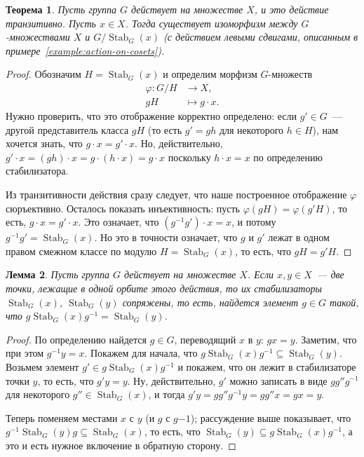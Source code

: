 \documentclass[a4paper,11pt]{scrartcl}
\theoremstyle{plain}
\newtheorem{theorem}{Теорема}[subsection]
\newtheorem{lemma}[theorem]{Лемма}
\theoremstyle{definition}
\newcommand\ph{\varphi}
\newcommand\Stab{\operatorname{Stab}}
\begin{document}
\begin{theorem}
Пусть группа $G$ действует на множестве $X$,
и это действие транзитивно.
Пусть $x\in X$.
Тогда существует изоморфизм между $G$-множествами $X$
и $G/\Stab_G(x)$ (с действием левыми сдвигами,
описанным в примере~\ref{example:action-on-cosets}).
\end{theorem}
\begin{proof}
Обозначим $H = \Stab_G(x)$ и
определим морфизм $G$-множеств
\begin{align*}
\ph\colon G/H & \to X,\\
gH & \mapsto g\cdot x.
\end{align*}
Нужно проверить, что это отображение корректно определено:
если $g'\in G$~--- другой представитель класса $gH$ (то есть
$g'=gh$ для некоторого $h\in H$), нам хочется знать, что
$g\cdot x = g'\cdot x$.
Но, действительно,
$g'\cdot x = (gh)\cdot x = g\cdot (h\cdot x) = g\cdot x$
поскольку $h\cdot x = x$ по определению стабилизатора.

Из транзитивности действия сразу следует, что наше
построенное отображение $\ph$ сюръективно.
Осталось показать инъективность: пусть $\ph(gH) = \ph(g'H)$,
то есть, $g\cdot x = g'\cdot x$.
Это означает, что $(g^{-1}g')\cdot x = x$,
и потому $g^{-1}g' = \Stab_G(x)$.
Но это в точности означает, что $g$ и $g'$ лежат в одном
правом смежном классе по модулю $H = \Stab_G(x)$,
то есть, что $gH = g'H$.
\end{proof}

\begin{lemma}
Пусть группа $G$ действует на множестве $X$.
Если $x,y\in X$~--- две точки, лежащие в одной орбите этого действия,
то их стабилизаторы $\Stab_G(x)$, $\Stab_G(y)$ сопряжены,
то есть, найдется элемент $g\in G$ такой, что
$g\Stab_G(x)g^{-1} = \Stab_G(y)$.
\end{lemma}
\begin{proof}
По определению найдется $g\in G$, переводящий $x$ в $y$:
$gx = y$. Заметим, что при этом $g^{-1}y = x$.
Покажем для начала, что $g\Stab_G(x)g^{-1} \subseteq \Stab_G(y)$.
Возьмем элемент $g'\in g\Stab_G(x)g^{-1}$ и покажем,
что он лежит в стабилизаторе точки $y$, то есть, что
$g'y = y$. Ну, действительно,
$g'$ можно записать в виде $g g'' g^{-1}$ для некоторого
$g''\in\Stab_G(x)$,
и тогда
$g'y = g g'' g^{-1} y = g g'' x = g x = y$.

Теперь поменяем местами $x$ с $y$ (и $g$ с $g{-1}$);
рассуждение выше показывает, что
$g^{-1}\Stab_G(y) g \subseteq \Stab_G(x)$,
то есть, что $\Stab_G(y) \subseteq g\Stab_G(x)g^{-1}$,
а это и есть нужное включение в обратную сторону.
\end{proof}
\end{document}
